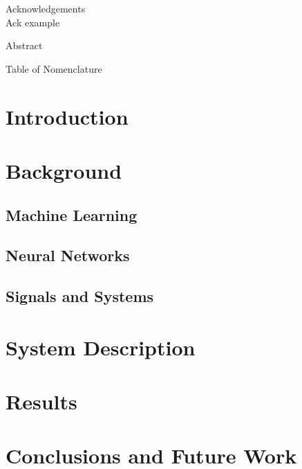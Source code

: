 \documentclass[12pt]{article}
\begin{document}
\newpage
{}
\setcounter{page}{1}

\newpage

\begin{center}
{\Large Acknowledgements} \\

\vspace{1in}
Ack example
\end{center}

\newpage

\begin{center}
{\Large Abstract} \\

\vspace{1in}

\end{center}


\newpage

\tableofcontents

\newpage

\listoffigures

\newpage

Table of Nomenclature

\clearpage
\setcounter{page}{1}

\fontsize{12pt}{24pt}\selectfont
\section{Introduction}

\newpage

\section{Background}
\subsection{Machine Learning}

\subsection{Neural Networks}

\subsection{Signals and Systems}

\newpage

\section{System Description}
\newpage


\section{Results}
\newpage


\section{Conclusions and Future Work}


\newpage

\nocite{*}
\fontsize{12pt}{16pt}\selectfont
{}

\end{document}

